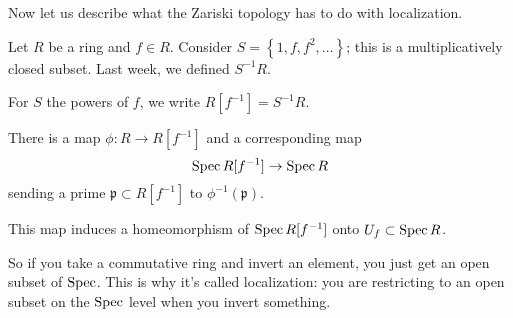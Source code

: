 Now let us describe what the Zariski topology has to do with
localization.

\begin{example} 
Let $R$ be a ring and $f \in R$. Consider $S = \left\{1, f, f^2,
\dots
\right\}$; this is a multiplicatively closed subset. Last week,
we defined
$S^{-1}R$.
\end{example}

\begin{definition} 
For $S$ the powers of $f$, we write $R[f^{-1}]=S^{-1}R$. 
\end{definition} 

There is  a map $\phi: R \to R[f^{-1}]$ and a corresponding map
\[ \operatorname{Spec} R[f^{-1}] \to \operatorname{Spec} R  \]
sending a prime $\mathfrak{p} \subset R[f^{-1}]$ to
$\phi^{-1}(\mathfrak{p})$.

\begin{proposition} 
This map induces a homeomorphism of $\operatorname{Spec} R[f^{-1}]$ onto $U_f
\subset \operatorname{Spec}
R$. 
\end{proposition} 

So if you take a commutative ring and invert an element, you
just get an open
subset of $\operatorname{Spec}$. This is why it's called localization: you are
restricting to
an open subset on the $\operatorname{Spec} $ level when you invert something.

